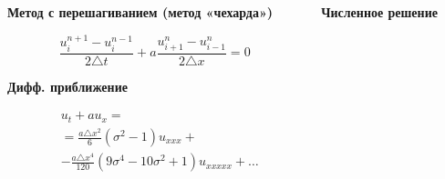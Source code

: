 \documentclass[10pt,xcolor=pst,aspectratio=169]{beamer}
\begin{document}
\begin{frame}{}

    \transdissolve[duration=0.1]
    \justifying
    \large



    \begin{columns}
        \begin{column}[T]{0.5\textwidth}
            \begin{center}
                \textbf{Метод с перешагиванием (метод «чехарда»)}
            \end{center}
            \[
                \frac{u^{n + 1}_{i} - u^{n - 1}_{i}}{2 \triangle t} + a \frac{u^{n}_{i + 1} - u^{n}_{i - 1}}{2 \triangle x} = 0
            \]
            \begin{center}
                \textbf{Дифф. приближение}
            \end{center}
            \[
                \begin{split}
                    &u_{t} + a u_{x} =\\
                    &= \frac{a \triangle x^{2}}{6} \left( \sigma^{2} - 1 \right) \boxed{u_{xxx}} +\\
                    &- \frac{a \triangle x^{4}}{120} (9 \sigma^{4} - 10 \sigma^{2} + 1) \boxed{u_{xxxxx}} + \ldots
                \end{split}
            \]
        \end{column}
        \begin{column}[T]{0.5\textwidth}
            \begin{center}
                \textbf{Численное решение}
            \end{center}
            \begin{center}
                 \begin{center}
                \end{center}
            \end{center}
        \end{column}
    \end{columns}

\end{frame}
\end{document}

